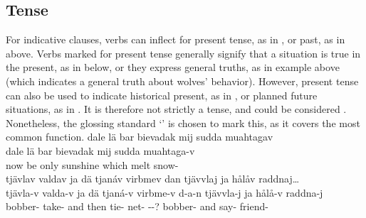 \subsection{Tense}\label{tense}
For indicative clauses, verbs can inflect for present tense, as in , or past, as in  above. %
Verbs marked for present tense generally signify that a situation is true in the present, as in  below, or they express general truths, as in example  above (which indicates a general truth about wolves’ behavior). However, present tense can also be used to indicate historical present, as in , or planned future situations, as in . It is therefore not strictly a  tense, and could be considered . %
Nonetheless, the glossing standard ‘\PRSs’ is chosen to mark this, as it covers the most common function. %
\ea\label{presentEx1}%
\glll	dale lä bar bievadak mij sudda muahtagav\\
	dale lä bar bievadak mij sudda muahtaga-v\\
	now be\BS{} only sunshine\BS{} which\BS{} melt\BS{} snow-\\\nopagebreak
{}	
\z
\ea\label{presentEx2}%
\glll	tjävlav valdav ja dä tjanáv virbmev {dan\footnotemark} tjävvlaj ja hålåv raddnaj…\\
	tjävla-v valda-v ja dä tjaná-v virbme-v d-a-n tjävvla-j ja hålå-v raddna-j\\
	bobber- take- and then tie- net- --? bobber- and say- friend-\\\nopagebreak
{} 	
